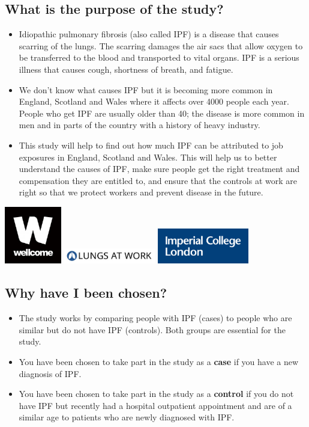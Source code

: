 \documentclass[a4paper,10pt]{article}
\begin{document}
\subsection*{What is the purpose of the study?}
\begin{itemize}
 \item Idiopathic pulmonary fibrosis (also called IPF) is a disease that causes scarring of the lungs. The scarring damages the air sacs that allow oxygen to be transferred to the blood and transported to vital organs. IPF is a serious illness that causes cough, shortness of breath, and fatigue.
 \item We don't know what causes IPF but it is becoming more common in England, Scotland and Wales where it affects over 4000 people each year. People who get IPF are usually older than 40; the disease is more common in men and in parts of the country with a history of heavy industry.  
 \item This study will help to find out how much IPF can be attributed to job exposures in England, Scotland and Wales. This will help us to better understand the causes of IPF, make sure people get the right treatment and compensation they are entitled to, and ensure that the controls at work are right so that we protect workers and prevent disease in the future.
\end{itemize}


\includegraphics[width=2.5cm]{fig/wellcome-logo-black.jpg}
\hspace{1cm}
\includegraphics[width=4cm]{fig/lungsatwork-logo.jpg}
\hspace{1cm}
\includegraphics[width=4cm]{fig/imperial-logo.jpg}

\subsection*{Why have I been chosen?}
\begin{itemize}
 \item The study works by comparing people with IPF (cases) to people who are similar but do not have IPF (controls). Both groups are essential for the study.
 \item You have been chosen to take part in the study as a \textbf{case} if you have a new diagnosis of IPF\@.
 \item You have been chosen to take part in the study as a \textbf{control} if you do not have IPF but recently had a hospital outpatient appointment and are of a similar age to patients who are newly diagnosed with IPF\@.  
\end{itemize}
\end{document}
